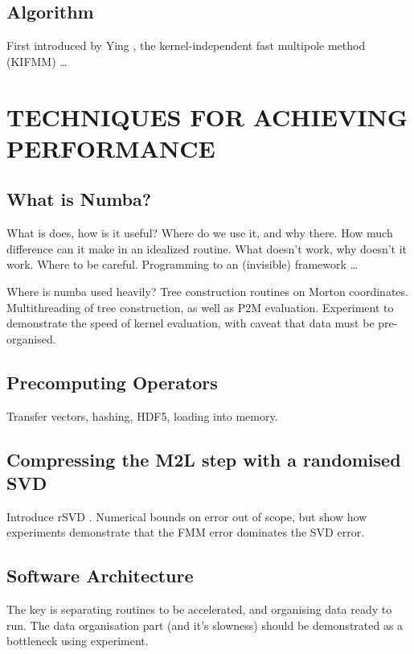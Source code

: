 \documentclass{IEEEcsmag}
\begin{document}
\subsection{Algorithm}

First introduced by Ying \cite{Ying2004}, the kernel-independent fast multipole method (KIFMM) \dots

\section{TECHNIQUES FOR ACHIEVING PERFORMANCE}

\subsection{What is Numba?}

What is does, how is it useful? Where do we use it, and why there. How much difference can it make in an idealized routine. What doesn't work, why doesn't it work. Where to be careful. Programming to an (invisible) framework \dots

Where is numba used heavily? Tree construction routines on Morton coordinates. Multithreading of tree construction, as well as P2M evaluation. Experiment to demonstrate the speed of kernel evaluation, with caveat that data must be pre-organised.

\subsection{Precomputing Operators}

Transfer vectors, hashing, HDF5, loading into memory.

\subsection{Compressing the M2L step with a randomised SVD}

Introduce rSVD \cite{Halko2011}. Numerical bounds on error out of scope, but show how experiments demonstrate that the FMM error dominates the SVD error.

\subsection{Software Architecture}

The key is separating routines to be accelerated, and organising data ready to run. The data organisation part (and it's slowness) should be demonstrated as a bottleneck using experiment.
\end{document}
